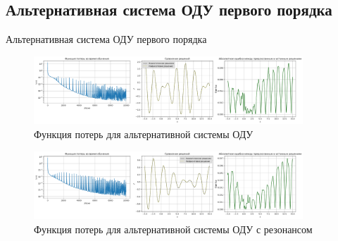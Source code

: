 \documentclass{beamer}
\begin{document}
\subsection{Альтернативная система ОДУ первого порядка}
\begin{frame}{Альтернативная система ОДУ первого порядка}
    \begin{figure}[h!]
        \centering
        \includegraphics[width=0.9\textwidth]{images/Loss&x_alt_ODE.png}
        \caption{Функция потерь для альтернативной системы ОДУ}
        \label{fig:loss_alt}
    \end{figure}
    \begin{figure}[h!]
        \centering
        \includegraphics[width=0.9\textwidth]{images/Loss&x_alt_ODE_resonance.png}
        \caption{Функция потерь для альтернативной системы ОДУ с резонансом}
        \label{fig:loss_alt_resonance}
    \end{figure}
\end{frame}
\end{document}
